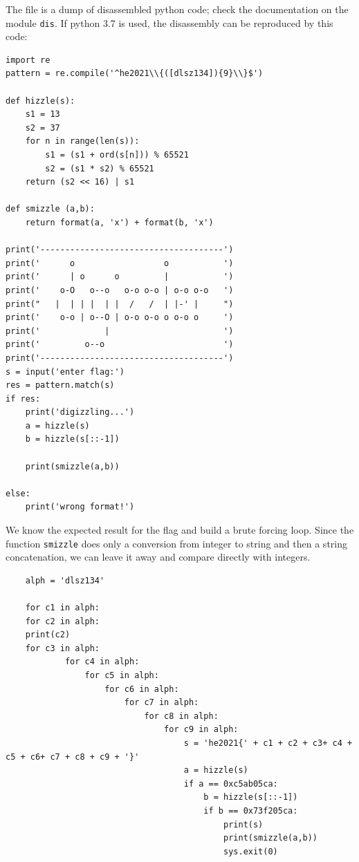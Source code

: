 \documentclass[english,a4paper,nols,noindent]{tufte-handout}
\begin{document}
\noindent The file is a dump of disassembled python code; check the
documentation on the module \verb+dis+.  If python 3.7 is used, the
disassembly can be reproduced by this code:

\begin{verbatim}
import re
pattern = re.compile('^he2021\\{([dlsz134]){9}\\}$')

def hizzle(s):
    s1 = 13
    s2 = 37
    for n in range(len(s)):
        s1 = (s1 + ord(s[n])) % 65521
        s2 = (s1 * s2) % 65521
    return (s2 << 16) | s1

def smizzle (a,b):
    return format(a, 'x') + format(b, 'x')

print('-------------------------------------')
print('      o                  o           ')
print('      | o      o         |           ')
print('    o-O   o--o   o-o o-o | o-o o-o   ')
print("   |  | | |  | |  /   /  | |-' |     ")
print('    o-o | o--O | o-o o-o o o-o o     ')
print('             |                       ')
print('         o--o                        ')
print('-------------------------------------')
s = input('enter flag:')
res = pattern.match(s)
if res:
    print('digizzling...')
    a = hizzle(s)
    b = hizzle(s[::-1])

    print(smizzle(a,b))

else:
    print('wrong format!')  
  \end{verbatim}

  We know the expected result for the flag and build a brute forcing
  loop.  Since the function \verb+smizzle+ does only a conversion from
  integer to string and then a string concatenation, we can leave it
  away and compare directly with integers.

  \begin{verbatim}
    alph = 'dlsz134'
    
    for c1 in alph:
    for c2 in alph:
    print(c2)
    for c3 in alph:
            for c4 in alph:
                for c5 in alph:
                    for c6 in alph:
                        for c7 in alph:
                            for c8 in alph:
                                for c9 in alph:
                                    s = 'he2021{' + c1 + c2 + c3+ c4 + c5 + c6+ c7 + c8 + c9 + '}'
                                    a = hizzle(s)
                                    if a == 0xc5ab05ca:
                                        b = hizzle(s[::-1])
                                        if b == 0x73f205ca:
                                            print(s)
                                            print(smizzle(a,b))
                                            sys.exit(0)
  
  \end{verbatim}
\end{document}
